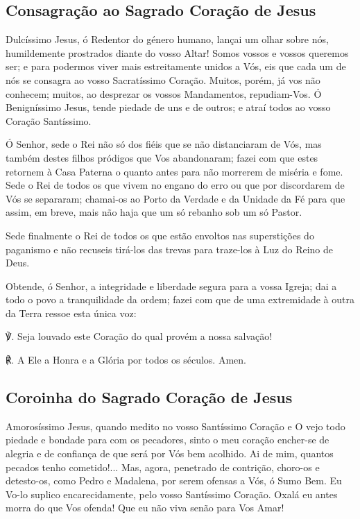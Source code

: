 \subsection{Consagração ao Sagrado Coração de Jesus}
 Dulcíssimo Jesus, ó Redentor do género humano, lançai um olhar sobre nós, humildemente prostrados diante do vosso Altar! Somos vossos e vossos queremos ser; e para podermos viver mais estreitamente unidos a Vós, eis que cada um de nós se consagra ao vosso Sacratíssimo Coração. Muitos, porém, já vos não conhecem; muitos, ao desprezar os vossos Mandamentos, repudiam-Vos. Ó Benigníssimo Jesus, tende piedade de uns e de outros; e atraí todos ao vosso Coração Santíssimo.\par
Ó Senhor, sede o Rei não só dos fiéis que se não distanciaram de Vós, mas também destes filhos pródigos que Vos abandonaram; fazei com que estes retornem à Casa Paterna o quanto antes para não morrerem de miséria e fome. Sede o Rei de todos os que vivem no engano do erro ou que por discordarem de Vós se separaram; chamai-os ao Porto da Verdade e da Unidade da Fé para que assim, em breve, mais não haja que um só rebanho sob um só Pastor.\par
Sede finalmente o Rei de todos os que estão envoltos nas superstições do paganismo e não recuseis tirá-los das trevas para traze-los à Luz do Reino de Deus.\par
Obtende, ó Senhor, a integridade e liberdade segura para a vossa Igreja; dai a todo o povo a tranquilidade da ordem; fazei com que de uma extremidade à outra da Terra ressoe esta única voz:\par
℣. Seja louvado este Coração do qual provém a nossa salvação!\par
℟. A Ele a Honra e a Glória por todos os séculos. Amen.

\subsection{Coroinha do Sagrado Coração de Jesus}

 Amorosíssimo Jesus, quando medito no vosso Santíssimo Coração e O vejo todo piedade e bondade para com os pecadores, sinto o meu coração encher-se de alegria e de confiança de que será por Vós bem acolhido. Ai de mim, quantos pecados tenho cometido!... Mas, agora, penetrado de contrição, choro-os e detesto-os, como Pedro e Madalena, por serem ofensas a Vós, ó Sumo Bem. Eu Vo-lo suplico encarecidamente, pelo vosso Santíssimo Coração. Oxalá eu antes morra do que Vos ofenda! Que eu não viva senão para Vos Amar!

